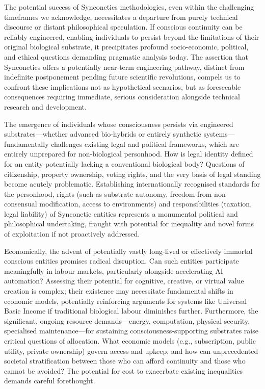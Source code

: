\documentclass[10pt]{article}
\begin{document}
\begin{sloppypar}

  The potential success of Synconetics methodologies, even within the challenging timeframes we acknowledge, necessitates a departure from purely technical discourse or distant philosophical speculation. If conscious continuity can be reliably engineered, enabling individuals to persist beyond the limitations of their original biological substrate, it precipitates profound socio-economic, political, and ethical questions demanding pragmatic analysis today. The assertion that Synconetics offers a potentially near-term engineering pathway, distinct from indefinite postponement pending future scientific revolutions, compels us to confront these implications not as hypothetical scenarios, but as foreseeable consequences requiring immediate, serious consideration alongside technical research and development.

  The emergence of individuals whose consciousness persists via engineered substrates—whether advanced bio-hybrids or entirely synthetic systems—fundamentally challenges existing legal and political frameworks, which are entirely unprepared for non-biological personhood. How is legal identity defined for an entity potentially lacking a conventional biological body? Questions of citizenship, property ownership, voting rights, and the very basis of legal standing become acutely problematic. Establishing internationally recognised standards for the personhood, rights (such as substrate autonomy, freedom from non-consensual modification, access to environments) and responsibilities (taxation, legal liability) of Synconetic entities represents a monumental political and philosophical undertaking, fraught with potential for inequality and novel forms of exploitation if not proactively addressed.

  Economically, the advent of potentially vastly long-lived or effectively immortal conscious entities promises radical disruption. Can such entities participate meaningfully in labour markets, particularly alongside accelerating AI automation? Assessing their potential for cognitive, creative, or virtual value creation is complex; their existence may necessitate fundamental shifts in economic models, potentially reinforcing arguments for systems like Universal Basic Income if traditional biological labour diminishes further. Furthermore, the significant, ongoing resource demands—energy, computation, physical security, specialised maintenance—for sustaining consciousness-supporting substrates raise critical questions of allocation. What economic models (e.g., subscription, public utility, private ownership) govern access and upkeep, and how can unprecedented societal stratification between those who can afford continuity and those who cannot be avoided? The potential for cost to exacerbate existing inequalities demands careful forethought.


\end{sloppypar}
\end{document}
